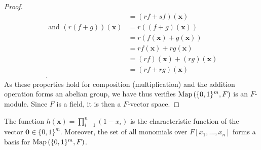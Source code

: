\begin{proof}
\begin{align*}
									      &= \left( rf + sf \right) \left( \textbf{x} \right)  \\
		\text{ and } \left( r\left( f+g \right)  \right) \left( \textbf{x} \right) &= r\left( \left( f+g \right) \left( \textbf{x} \right)  \right)  \\
											   &= r\left( f\left( \textbf{x} \right) + g\left( \textbf{x} \right)   \right)  \\
											   &= rf\left( \textbf{x} \right)  + rg\left( \textbf{x} \right)  \\
											   &= \left( rf \right) \left( \textbf{x} \right)  + \left( rg \right) \left( \textbf{x} \right)  \\
											   &= \left( rf + rg \right) \left( \textbf{x} \right)  \\
	.\end{align*}
	As these properties hold for composition (multiplication) and the addition operation forms an abelian group, we have thus verifies \(\operatorname{Map}\left( \{0, 1\} ^{m}, F \right) \) is an \(F\)-module. Since \(F\) is a field, it is then a \(F\)-vector space.
\end{proof}
\begin{proposition}
	The function \(h\left( \textbf{x} \right) = \prod_{i= 1}^{n} \left( 1- x_{i} \right) \)	is the characteristic function of the vector \(\textbf{0} \in \{0, 1\} ^{m}\). Moreover, the set of all monomials over \(F\left[ x_1, \ldots, x_{n} \right] \) forms a basis for \(\operatorname{Map}\left( \{0, 1\} ^{m}, F \right) \).
\end{proposition}
